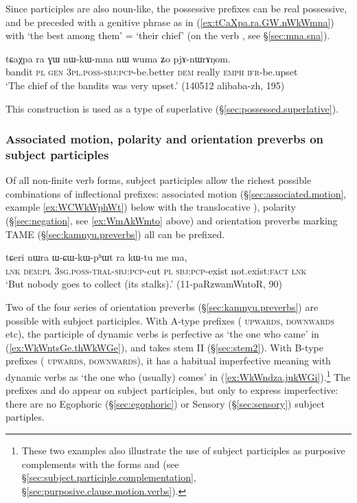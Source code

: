 Since participles are also noun-like, the possessive prefixes can be real possessive, and be preceded with a genitive phrase as in (\ref{ex:tCaXpa.ra.GW.nWkWmna}) with  `the best among them' = `their chief' (on the verb , see §\ref{sec:mna.sna}).

 \begin{exe} 
\ex \label{ex:tCaXpa.ra.GW.nWkWmna}
\gll tɕaχpa ra ɣɯ nɯ-kɯ-mna nɯ wuma ʑo pjɤ-nɯrɤŋom.\\
bandit \textsc{pl} \textsc{gen} \textsc{3pl}.\textsc{poss}-\textsc{sbj}:\textsc{pcp}-be.better \textsc{dem} really \textsc{emph} \textsc{ifr}-be.upset\\
\glt `The chief of the bandits was very upset.' (140512 alibaba-zh, 195)
\end{exe}

This construction is used as a type of superlative (§\ref{sec:possessed.superlative}).

\subsubsection{Associated motion, polarity and orientation preverbs on subject participles}  \label{sec:subject.participle.other.prefixes}
Of all non-finite verb forms, subject participles allow the richest possible combinations of inflectional prefixes: associated motion (§\ref{sec:associated.motion}, example \ref{ex:WCWkWphWt}) below with the translocative ), polarity (§\ref{sec:negation}, see \ref{ex:WmAkWmto} above) and orientation preverbs marking TAME (§\ref{sec:kamnyu.preverbs}) all can be prefixed. 
 
\begin{exe}
\ex \label{ex:WCWkWphWt}
 \gll tɕeri nɯra ɯ-ɕɯ-kɯ-pʰɯt ra kɯ-tu me ma,   \\
 \textsc{lnk} \textsc{dem}:\textsc{pl} \textsc{3sg}.\textsc{poss}-\textsc{tral}-\textsc{sbj}:\textsc{pcp}-cut \textsc{pl} \textsc{sbj}:\textsc{pcp}-exist not.exist:\textsc{fact} \textsc{lnk} \\
 \glt `But nobody goes to collect (its stalks).' (11-paRzwamWntoR, 90)
\end{exe}

Two of the four series of orientation preverbs (§\ref{sec:kamnyu.preverbs}) are possible with subject participles. With A-type prefixes ( \textsc{upwards},  \textsc{downwards} etc), the participle of dynamic verbs is perfective as  `the one who came' in (\ref{ex:WkWntsGe.thWkWGe}), and takes stem II (§\ref{sec:stem2}). With B-type prefixes ( \textsc{upwards},  \textsc{downwards}), it has a habitual imperfective meaning with dynamic verbs as  `the one who (usually) comes' in (\ref{ex:WkWndza.jukWGi}).\footnote{These two examples also illustrate the use of subject participles as purposive complements with the forms  and  (see §\ref{sec:subject.participle.complementation}, §\ref{sec:purposive.clause.motion.verbs}).} The prefixes and  do appear on subject participles, but only to express imperfective: there are no Egophoric (§\ref{sec:egophoric}) or Sensory (§\ref{sec:sensory}) subject partiples.

